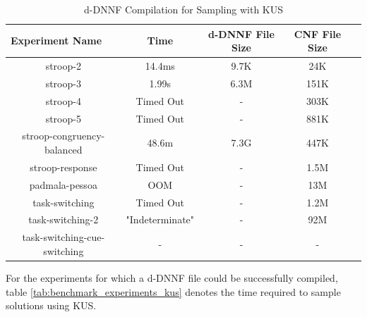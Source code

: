 \begin{table}[htb]
  \centering
  \caption{d-DNNF Compilation for Sampling with KUS}
\begin{tabular}{|c|c|c|c|c|}
\hline
\multicolumn{1}{|l|}{Experiment Name} & Time            & d-DNNF File Size     & CNF File Size            \\ \hline
stroop-2                              & 14.4ms          & 9.7K                 & 24K                      \\ \hline
stroop-3                              & 1.99s           & 6.3M                 & 151K                     \\ \hline
stroop-4                              & Timed Out       & -                    & 303K                     \\ \hline
stroop-5                              & Timed Out       & -                    & 881K                     \\ \hline
stroop-congruency-balanced            & 48.6m           & 7.3G                 & 447K                     \\ \hline
stroop-response                       & Timed Out       & -                    & 1.5M                     \\ \hline
padmala-pessoa                        & OOM             & -                    & 13M                      \\ \hline
task-switching                        & Timed Out       & -                    & 1.2M                     \\ \hline
task-switching-2                      & "Indeterminate" & -                    & 92M                      \\ \hline %
task-switching-cue-switching          & -               & -                    & -                        \\ \hline
\end{tabular}
\label{tab:benchmark_experiments_d4}
\end{table}


For the experiments for which a d-DNNF file could be successfully compiled, table \ref{tab:benchmark_experiments_kus} denotes the time required to sample solutions using KUS.


